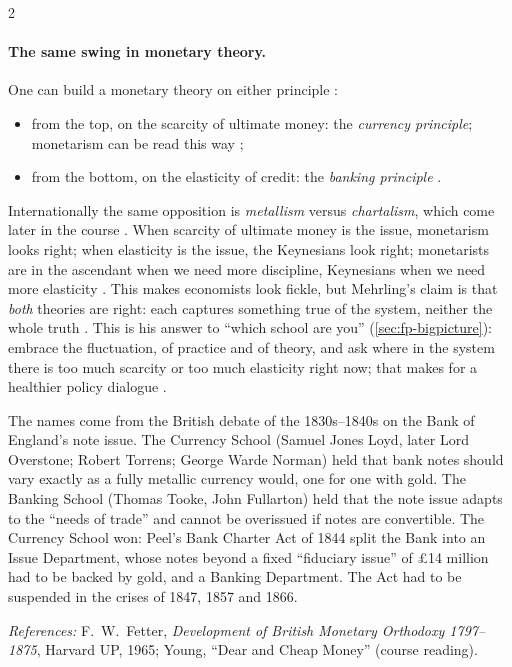 \begin{paracol}{2}
\paragraph{The same swing in monetary theory.} One can build a monetary theory on either principle :
\begin{itemize}
  \item from the top, on the scarcity of ultimate money: the \emph{currency principle}; monetarism can be read this way
        ;
  \item from the bottom, on the elasticity of credit: the \emph{banking principle} .
\end{itemize}
Internationally the same opposition is \emph{metallism} versus \emph{chartalism}, which come later in the course
. When scarcity of ultimate money is the issue, monetarism looks right; when elasticity is the issue,
the Keynesians look right; monetarists are in the ascendant when we need more discipline, Keynesians when we need more
elasticity . This makes economists look fickle, but Mehrling's claim is that \emph{both}
theories are right: each captures something true of the system, neither the whole truth .
This is his answer to ``which school are you'' (\cref{sec:fp-bigpicture}): embrace the fluctuation, of practice and of
theory, and ask where in the system there is too much scarcity or too much elasticity right now; that makes for a
healthier policy dialogue .\begin{history}
The names come from the British debate of the 1830s--1840s on the Bank of England's note issue. The Currency School
(Samuel Jones Loyd, later Lord Overstone; Robert Torrens; George Warde Norman) held that bank notes should vary
exactly as a fully metallic currency would, one for one with gold. The Banking School (Thomas Tooke, John Fullarton)
held that the note issue adapts to the ``needs of trade'' and cannot be overissued if notes are convertible. The
Currency School won: Peel's Bank Charter Act of 1844 split the Bank into an Issue Department, whose notes beyond a
fixed ``fiduciary issue'' of \pounds14 million had to be backed by gold, and a Banking Department. The Act had to be
suspended in the crises of 1847, 1857 and 1866.\par
\emph{References:} F.~W.~Fetter, \emph{Development of British Monetary Orthodoxy 1797--1875}, Harvard UP, 1965;
Young, ``Dear and Cheap Money'' (course reading).
\end{history}


\end{paracol}

